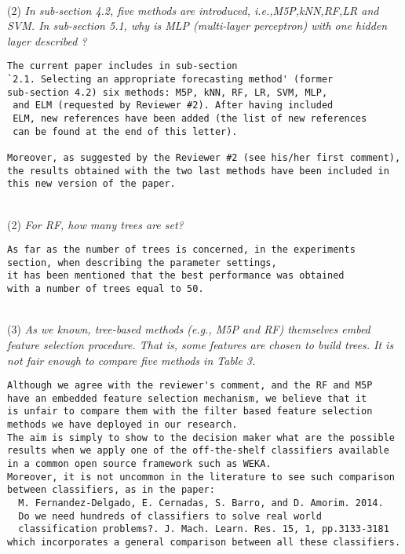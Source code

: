\documentclass[preprint]{elsarticle}
\begin{document}
~\\
\noindent (2) \emph{In sub-section 4.2, five methods are introduced, i.e.,M5P,kNN,RF,LR and SVM. In sub-section 5.1, why is MLP (multi-layer perceptron) with one hidden layer described ?} 

\begin{verbatim}
The current paper includes in sub-section 
`2.1. Selecting an appropriate forecasting method' (former
sub-section 4.2) six methods: M5P, kNN, RF, LR, SVM, MLP,
 and ELM (requested by Reviewer #2). After having included
 ELM, new references have been added (the list of new references
 can be found at the end of this letter).

Moreover, as suggested by the Reviewer #2 (see his/her first comment), 
the results obtained with the two last methods have been included in 
this new version of the paper.
\end{verbatim}

~\\
\noindent (2) \emph{For RF, how many trees are set? }

\begin{verbatim}
As far as the number of trees is concerned, in the experiments 
section, when describing the parameter settings, 
it has been mentioned that the best performance was obtained 
with a number of trees equal to 50.
\end{verbatim}


~\\
\noindent (3) \emph{As we known, tree-based methods (e.g., M5P and RF) themselves embed feature selection procedure. That is, some features are chosen to build trees. It is not fair enough to compare five methods in Table 3. } 

\begin{verbatim}
Although we agree with the reviewer's comment, and the RF and M5P 
have an embedded feature selection mechanism, we believe that it 
is unfair to compare them with the filter based feature selection 
methods we have deployed in our research. 
The aim is simply to show to the decision maker what are the possible 
results when we apply one of the off-the-shelf classifiers available 
in a common open source framework such as WEKA. 
Moreover, it is not uncommon in the literature to see such comparison 
between classifiers, as in the paper:
  M. Fernandez-Delgado, E. Cernadas, S. Barro, and D. Amorim. 2014. 
  Do we need hundreds of classifiers to solve real world 
  classification problems?. J. Mach. Learn. Res. 15, 1, pp.3133-3181
which incorporates a general comparison between all these classifiers.
\end{verbatim}
\end{document}
